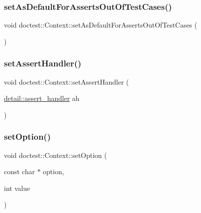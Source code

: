 \subsubsection{\texorpdfstring{set\+As\+Default\+For\+Asserts\+Out\+Of\+Test\+Cases()}{setAsDefaultForAssertsOutOfTestCases()}}
{\footnotesize\ttfamily void doctest\+::\+Context\+::set\+As\+Default\+For\+Asserts\+Out\+Of\+Test\+Cases (\begin{DoxyParamCaption}{ }\end{DoxyParamCaption})}

\mbox{\label{classdoctest_1_1_context_a669dd0a596a611eeb0decdb78b661a90}} 
\subsubsection{\texorpdfstring{set\+Assert\+Handler()}{setAssertHandler()}}
{\footnotesize\ttfamily void doctest\+::\+Context\+::set\+Assert\+Handler (\begin{DoxyParamCaption}\item[{\hyperlink{namespacedoctest_1_1detail_a5b5db6997f20389de5735e3ee3439b95}{detail\+::assert\+\_\+handler}}]{ah }\end{DoxyParamCaption})}

\mbox{\label{classdoctest_1_1_context_a95e7a0230c5897f0eae36718f51d2f05}} 
\subsubsection{\texorpdfstring{set\+Option()}{setOption()}\hspace{0.1cm}{\footnotesize\ttfamily [1/2]}}
{\footnotesize\ttfamily void doctest\+::\+Context\+::set\+Option (\begin{DoxyParamCaption}\item[{const char $\ast$}]{option,  }\item[{int}]{value }\end{DoxyParamCaption})}

\mbox{\label{classdoctest_1_1_context_a4352ffc196c4ba56045270e45baa2754}} 
